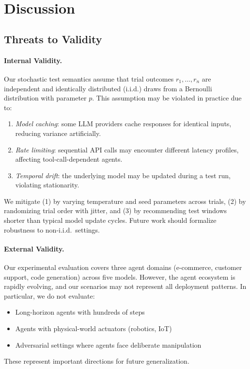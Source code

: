 
\section{Discussion}
\label{sec:discussion}

\subsection{Threats to Validity}
\label{sec:discussion:threats}

\paragraph{Internal Validity.}
Our stochastic test semantics assume that trial outcomes $r_1, \ldots,
r_n$ are independent and identically distributed (i.i.d.) draws from a
Bernoulli distribution with parameter $p$. This assumption may be
violated in practice due to:
\begin{enumerate}[leftmargin=*]
  \item \emph{Model caching}: some LLM providers cache responses for
    identical inputs, reducing variance artificially.
  \item \emph{Rate limiting}: sequential API calls may encounter
    different latency profiles, affecting tool-call-dependent agents.
  \item \emph{Temporal drift}: the underlying model may be updated during
    a test run, violating stationarity.
\end{enumerate}
We mitigate (1) by varying temperature and seed parameters across
trials, (2) by randomizing trial order with jitter, and (3) by
recommending test windows shorter than typical model update cycles.
Future work should formalize robustness to non-i.i.d.\ settings.

\paragraph{External Validity.}
Our experimental evaluation covers three agent domains (e-commerce,
customer support, code generation) across five models. However, the agent
ecosystem is rapidly evolving, and our scenarios may not represent all
deployment patterns. In particular, we do not evaluate:
\begin{itemize}[leftmargin=*]
  \item Long-horizon agents with hundreds of steps
  \item Agents with physical-world actuators (robotics, IoT)
  \item Adversarial settings where agents face deliberate manipulation
\end{itemize}
These represent important directions for future generalization.

